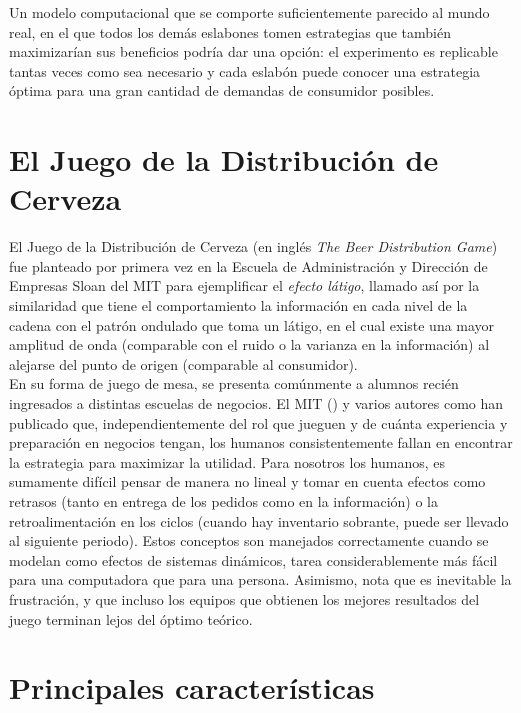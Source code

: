 Un modelo computacional que se comporte suficientemente parecido al mundo real, en el que todos los demás eslabones tomen estrategias que también maximizarían sus beneficios podría dar una opción: el experimento es replicable tantas veces como sea necesario y cada eslabón puede conocer una estrategia óptima para una gran cantidad de demandas de consumidor posibles.\\

\section{El Juego de la Distribuci\'on de Cerveza}

El Juego de la Distribuci\'on de Cerveza (en ingl\'es \textit{The Beer Distribution Game}) \cite{StermanArt} fue planteado por primera vez en la Escuela de Administraci\'on y Direcci\'on de Empresas Sloan del MIT para ejemplificar el \textit{efecto l\'atigo}, llamado as\'i por la similaridad que tiene el comportamiento la informaci\'on en cada nivel de la cadena con el patr\'on ondulado que toma un l\'atigo, en el cual existe una mayor amplitud de onda (comparable con el ruido o la varianza en la informaci\'on) al alejarse del punto de origen (comparable al consumidor). \\

En su forma de juego de mesa, se presenta com\'unmente a alumnos reci\'en ingresados a distintas escuelas de negocios. El MIT (\citet{Dizikes}) y varios autores como \citet{Sterman} han publicado que, independientemente del rol que jueguen y de cu\'anta experiencia y preparaci\'on en negocios tengan, los humanos consistentemente fallan en encontrar la estrategia para maximizar la utilidad. Para nosotros los humanos, es sumamente dif\'icil pensar de manera no lineal y tomar en cuenta efectos como retrasos (tanto en entrega de los pedidos como en la informaci\'on) o la retroalimentaci\'on en los ciclos (cuando hay inventario sobrante, puede ser llevado al siguiente periodo). Estos conceptos son manejados correctamente cuando se modelan como efectos de sistemas din\'amicos, tarea considerablemente m\'as f\'acil para una computadora que para una persona. Asimismo, nota que es inevitable la frustraci\'on, y que incluso los equipos que obtienen los mejores resultados del juego terminan lejos del \'optimo te\'orico.\\

\section{Principales caracter\'isticas}

